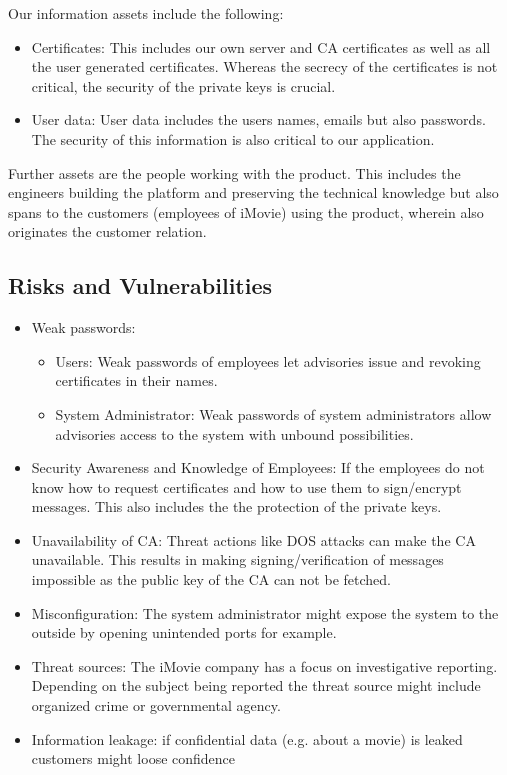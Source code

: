 \documentclass[english]{article}
\begin{document}
Our information assets include the following:

\begin{itemize}
	\item Certificates: This includes our own server and CA certificates as well as all the user generated certificates. Whereas the secrecy of the certificates is not critical, the security of the private keys is crucial. 
	\item User data: User data includes the users names, emails but also passwords. The security of this information is also critical to our application.
\end{itemize}

Further assets are the people working with the product. This includes the engineers building the platform and preserving the technical knowledge but also spans to the customers (employees of iMovie) using the product, wherein also originates the customer relation.   

\subsection{Risks and Vulnerabilities}

\begin{itemize}
    \item Weak passwords: 
    \begin{itemize}
        \item Users: Weak passwords of employees let advisories issue and revoking certificates in their names.
        \item System Administrator: Weak passwords of system administrators allow advisories access to the system with unbound possibilities.
    \end{itemize}
    \item Security Awareness and Knowledge of Employees: If the employees do not know how to request certificates and how to use them to sign/encrypt messages. This also includes the the protection of the private keys.
    \item Unavailability of CA: Threat actions like DOS attacks can make the CA unavailable. This results in making signing/verification of messages impossible as the public key of the CA can not be fetched. 
    \item Misconfiguration: The system administrator might expose the system to the outside by opening unintended ports for example.
    \item Threat sources: The iMovie company has a focus on investigative reporting. Depending on the subject being reported the threat source might include organized crime or governmental agency. 
    \item Information leakage: if confidential data (e.g. about a movie) is leaked customers might loose confidence
    \script 
\end{itemize}
\end{document}
